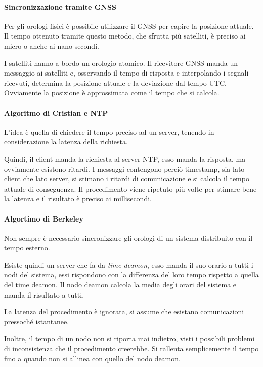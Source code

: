 \paragraph{Sincronizzazione tramite GNSS}
Per gli orologi fisici è possibile utilizzare 
il GNSS per capire la posizione attuale. 
Il tempo ottenuto tramite questo metodo, 
che sfrutta più satelliti, 
è preciso ai micro o anche ai nano secondi. 

I satelliti hanno a bordo un orologio atomico.
Il ricevitore GNSS manda un messaggio ai satelliti e, 
osservando il tempo di risposta e interpolando 
i segnali ricevuti, determina la posizione attuale e 
la deviazione dal tempo UTC. Ovviamente la 
posizione è approssimata come il tempo che si calcola.

\paragraph{Algoritmo di Cristian e NTP}
L'idea è quella di chiedere il tempo preciso ad un server,
tenendo in considerazione la latenza della richiesta.

Quindi, il client manda la richiesta al server NTP, 
esso manda la risposta, ma ovviamente esistono ritardi.
I messaggi contengono perciò timestamp, sia lato client che 
lato server, si stimano i ritardi di comunicazione e si calcola
il tempo attuale di conseguenza. Il procedimento 
viene ripetuto più volte per stimare bene la latenza e il 
risultato è preciso ai millisecondi.

\paragraph{Algortimo di Berkeley}
Non sempre è necessario sincronizzare gli orologi 
di un sistema distribuito con il tempo esterno. 

Esiste quindi un server che fa da \emph{time deamon}, 
esso manda il suo orario a tutti i nodi 
del sistema, essi rispondono con la differenza 
del loro tempo rispetto a quella del time deamon. 
Il nodo deamon calcola la media degli orari del sistema 
e manda il risultato a tutti. 

La latenza del procedimento è ignorata, si assume che 
esistano comunicazioni pressoché istantanee.

Inoltre, il tempo di un nodo non si riporta mai indietro, 
visti i possibili problemi di inconsistenza che il procedimento 
creerebbe. Si rallenta semplicemente il tempo fino a quando 
non si allinea con quello del nodo deamon.

